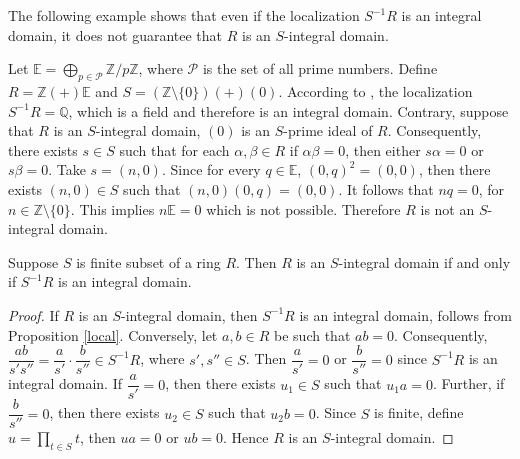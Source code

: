 \documentclass[11pt]{article}
\begin{document}
	The following example shows that even if the localization $S^{-1}R$ is an integral domain, it does not guarantee that $R$ is an $S$-integral domain. 
	
	\begin{eg}\label{nsint}
		Let $\mathbb{E}=\bigoplus_{p\in\mathcal{P}}\mathbb{Z}/p\mathbb{Z}$, where $\mathcal{P}$ is the set of all prime numbers. Define $R=\mathbb{Z} (+) \mathbb{E}$ and $S=(\mathbb{Z}\setminus\{0\}) (+)(0)$. According to \cite[Example 3.12]{ki24}, the localization 
	$S^{-1}R=\mathbb{Q}$, which is a field and therefore is an integral domain. Contrary, suppose that $R$ is an $S$-integral domain, $(0)$ is an $S$-prime ideal of $R$. Consequently, there exists $s\in S$ such that for each $\alpha, \beta\in R$ if $\alpha\beta=0$, then either $s\alpha=0$ or $s\beta=0$. Take $s=(n, 0)$. Since for every $q\in \mathbb{E}$, $(0, q)^{2}= (0, 0)$, then there exists $(n, 0)\in S$ such that $(n, 0)(0, q)=(0,0)$. It follows that $nq=0$, for $n\in\mathbb{Z}\setminus\{0\}$. This implies $n\mathbb{E}=0$ which is not possible. Therefore $R$ is not an $S$-integral domain.
	\end{eg}
	\begin{theorem}\label{domain} Suppose  $S$ is finite subset of a ring $R$. Then
		 $R$ is an $S$-integral domain if and only if $S^{-1}R$ is an integral domain.
	\end{theorem}
	\begin{proof}
		If $R$ is an $S$-integral domain, then $S^{-1}R$ is an integral domain,  follows from Proposition \ref{local}. Conversely, let $a, b \in R$ be such that $ab=0$. Consequently, $\dfrac{ab}{s's''} = \dfrac{a}{s'}\cdot\dfrac{b}{s''} \in S^{-1}R$, where $s', s'' \in S$. Then $\dfrac{a}{s'} = 0$ or $\dfrac{b}{s''} = 0$ since $S^{-1}R$ is an integral domain. If $\dfrac{a}{s'}= 0$, then there exists $u_1 \in S$ such that $u_1a = 0$. Further, if $\dfrac{b}{s''} = 0$, then there exists $u_2 \in S$ such that $u_2b = 0$. Since $S$ is finite, define $u = \prod_{t\in S}t $, then $ua = 0$ or $ub = 0$. Hence $R$ is an $S$-integral domain. 
	\end{proof}
	
\end{document}
